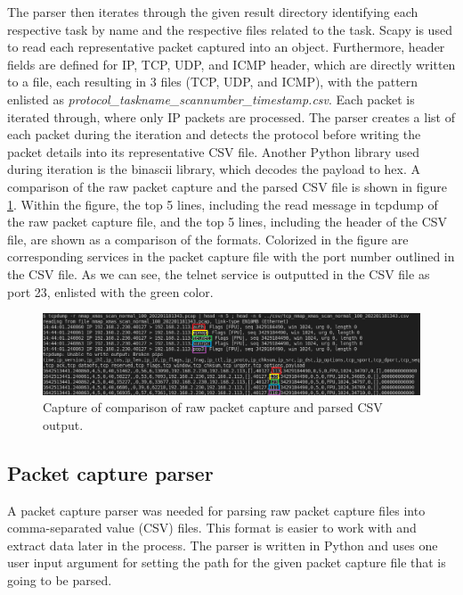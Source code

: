 The parser then iterates through the given result directory identifying each respective task by name and the respective files related to the task. Scapy is used to read each representative packet captured into an object. Furthermore, header fields are defined for IP, TCP, UDP, and ICMP header, which are directly written to a file, each resulting in 3 files (TCP, UDP, and ICMP), with the pattern enlisted as \textit{protocol\_taskname\_scannumber\_timestamp.csv}.
Each packet is iterated through, where only IP packets are processed. The parser creates a list of each packet during the iteration and detects the protocol before writing the packet details into its representative CSV file.
Another Python library used during iteration is the binascii library, which decodes the payload to hex.
A comparison of the raw packet capture and the parsed CSV file is shown in figure \ref{fig:LabPacketCSV}.
Within the figure, the top 5 lines, including the read message in tcpdump of the raw packet capture file, and the top 5 lines, including the header of the CSV file, are shown as a comparison of the formats.
Colorized in the figure are corresponding services in the packet capture file with the port number outlined in the CSV file.
As we can see, the telnet service is outputted in the CSV file as port 23, enlisted with the green color.



\begin{figure}[htbp]
\centerline{\includegraphics[scale=0.4]{images/lab/tcpdumpcsvdiff.png}}
\caption{Capture of comparison of raw packet capture and parsed CSV output.}
\label{fig:LabPacketCSV}
\end{figure}

\subsection{Packet capture parser}
\label{ss:PcapParser}

A packet capture parser was needed for parsing raw packet capture files into comma-separated value (CSV) files.
This format is easier to work with and extract data later in the process.
The parser is written in Python and uses one user input argument for setting the path for the given packet capture file that is going to be parsed.

